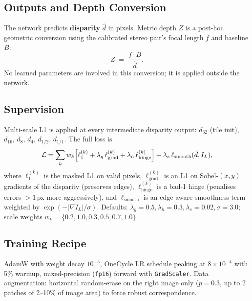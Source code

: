 \documentclass[11pt,a4paper]{article}
\begin{document}
\subsection{Outputs and Depth Conversion}
The network predicts \textbf{disparity} $\hat{d}$ in pixels. Metric
depth $Z$ is a post-hoc geometric conversion using the calibrated
stereo pair's focal length $f$ and baseline $B$:
\[
  Z \;=\; \frac{f \cdot B}{\hat{d}}.
\]
No learned parameters are involved in this conversion; it is applied
outside the network.

\subsection{Supervision}
Multi-scale L1 is applied at every intermediate disparity output:
$d_{32}$ (tile init), $d_{16}$, $d_{8}$, $d_{4}$, $d_{1/2}$, $d_{1/1}$.
The full loss is
\[
  \mathcal{L} = \sum_{k} w_k \Bigl[
    \ell_1^{(k)}
    + \lambda_g\,\ell_\text{grad}^{(k)}
    + \lambda_h\,\ell_\text{hinge}^{(k)}
  \Bigr]
    + \lambda_s\,\ell_\text{smooth}(\hat{d}, I_L),
\]
where $\ell_1^{(k)}$ is the masked L1 on valid pixels,
$\ell_\text{grad}^{(k)}$ is an L1 on Sobel-$(x,y)$ gradients of the
disparity (preserves edges), $\ell_\text{hinge}^{(k)}$ is a bad-1 hinge
(penalises errors $> 1$\,px more aggressively), and
$\ell_\text{smooth}$ is an edge-aware smoothness term weighted by
$\exp(-|\nabla I_L|/\sigma)$. Defaults:
$\lambda_g = 0.5, \lambda_h = 0.3, \lambda_s = 0.02, \sigma = 3.0$;
scale weights $w_k = \{0.2, 1.0, 0.3, 0.5, 0.7, 1.0\}$.

\subsection{Training Recipe}
AdamW with weight decay $10^{-5}$, OneCycle LR schedule peaking at
$8\times 10^{-4}$ with 5\% warmup, mixed-precision (\texttt{fp16}) forward
with \texttt{GradScaler}. Data augmentation: horizontal random-erase on
the right image only ($p=0.3$, up to 2 patches of 2--10\% of image
area) to force robust correspondence.
\end{document}
